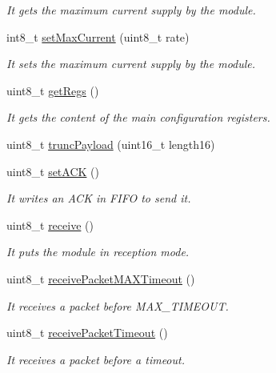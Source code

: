 \begin{DoxyCompactItemize}
\begin{DoxyCompactList}\small\item\em It gets the maximum current supply by the module. \end{DoxyCompactList}\item 
int8\+\_\+t \hyperlink{class_wasp_s_x1272_a4ecab36e30981047f5bf8fb83ddf6c6f}{set\+Max\+Current} (uint8\+\_\+t rate)
\begin{DoxyCompactList}\small\item\em It sets the maximum current supply by the module. \end{DoxyCompactList}\item 
uint8\+\_\+t \hyperlink{class_wasp_s_x1272_a09e6bbe1e24b97c68f6a628cd57bc850}{get\+Regs} ()
\begin{DoxyCompactList}\small\item\em It gets the content of the main configuration registers. \end{DoxyCompactList}\item 
uint8\+\_\+t \hyperlink{class_wasp_s_x1272_ae4f23c81125693128bdfe0418bbb4436}{trunc\+Payload} (uint16\+\_\+t length16)
\item 
uint8\+\_\+t \hyperlink{class_wasp_s_x1272_ad733a7c8538845be0bd39d5c53d53e66}{set\+A\+CK} ()
\begin{DoxyCompactList}\small\item\em It writes an A\+CK in F\+I\+FO to send it. \end{DoxyCompactList}\item 
uint8\+\_\+t \hyperlink{class_wasp_s_x1272_a694eecb5441dbef491d53610dbba3f38}{receive} ()
\begin{DoxyCompactList}\small\item\em It puts the module in reception mode. \end{DoxyCompactList}\item 
uint8\+\_\+t \hyperlink{class_wasp_s_x1272_a7b1c3d46e9a4da8d35ab9054211c0ba4}{receive\+Packet\+M\+A\+X\+Timeout} ()
\begin{DoxyCompactList}\small\item\em It receives a packet before M\+A\+X\+\_\+\+T\+I\+M\+E\+O\+UT. \end{DoxyCompactList}\item 
uint8\+\_\+t \hyperlink{class_wasp_s_x1272_a52a5086cdd4fab4f48d3e325e0100a83}{receive\+Packet\+Timeout} ()
\begin{DoxyCompactList}\small\item\em It receives a packet before a timeout. \end{DoxyCompactList}\item 

\end{DoxyCompactItemize}
